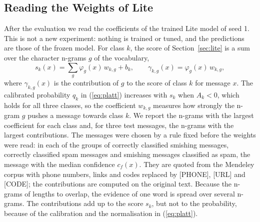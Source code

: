 \subsection{Reading the Weights of Lite}\label{sec:explain-method}

After the evaluation we read the coefficients of the trained Lite model of seed 1. This is not a new experiment: nothing is trained or tuned, and the predictions are those of the frozen model. For class $k$, the score of Section~\ref{sec:lite} is a sum over the character n-grams $g$ of the vocabulary,
\begin{equation}\label{eq:contrib}
s_k(x)=\sum_{g}\varphi_g(x)\,w_{k,g}+b_k,\qquad \gamma_{k,g}(x)=\varphi_g(x)\,w_{k,g},
\end{equation}
where $\gamma_{k,g}(x)$ is the contribution of $g$ to the score of class $k$ for message $x$. The calibrated probability $q_k$ in (\ref{eq:platt}) increases with $s_k$ when $A_k<0$, which holds for all three classes, so the coefficient $w_{k,g}$ measures how strongly the n-gram $g$ pushes a message towards class $k$. We report the  n-grams with the largest coefficient for each class and, for three test messages, the n-grams with the largest contributions. The messages were chosen by a rule fixed before the weights were read: in each of the groups of correctly classified smishing messages, correctly classified spam messages and smishing messages classified as spam, the message with the median confidence $c_f(x)$. They are quoted from the Mendeley corpus \cite{mendeley2022} with phone numbers, links and codes replaced by [PHONE], [URL] and [CODE]; the contributions are computed on the original text. Because the n-grams of lengths  to  overlap, the evidence of one word is spread over several n-grams. The contributions add up to the score $s_k$, but not to the probability, because of the calibration and the normalisation in (\ref{eq:platt}).
